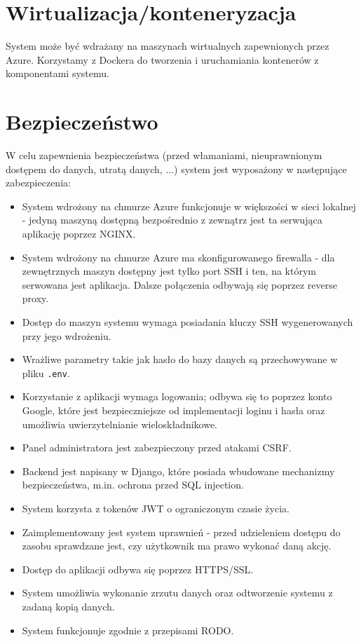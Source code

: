 \documentclass[11pt,a4paper]{article}
\renewcommand{\_}{\char`_}
\begin{document}
\section{Wirtualizacja/konteneryzacja}

System może być wdrażany na maszynach wirtualnych zapewnionych przez Azure. Korzystamy z Dockera do tworzenia i uruchamiania kontenerów z komponentami systemu.

\section{Bezpieczeństwo}

W celu zapewnienia bezpieczeństwa (przed włamaniami, nieuprawnionym dostępem do danych, utratą danych, ...) system jest wyposażony w następujące zabezpieczenia:
\begin{itemize}
    \item System wdrożony na chmurze Azure funkcjonuje w większości w sieci lokalnej - jedyną maszyną dostępną bezpośrednio z zewnątrz jest ta serwująca aplikację poprzez NGINX.
    \item System wdrożony na chmurze Azure ma skonfigurowanego firewalla - dla zewnętrznych maszyn dostępny jest tylko port SSH i ten, na którym serwowana jest aplikacja. Dalsze połączenia odbywają się poprzez reverse proxy.
    \item Dostęp do maszyn systemu wymaga posiadania kluczy SSH wygenerowanych przy jego wdrożeniu.
    \item Wrażliwe parametry takie jak hasło do bazy danych są przechowywane w pliku \texttt{.env}.
    \item Korzystanie z aplikacji wymaga logowania; odbywa się to poprzez konto Google, które jest bezpieczniejsze od implementacji loginu i hasła oraz umożliwia uwierzytelnianie wieloskładnikowe.
    \item Panel administratora jest zabezpieczony przed atakami CSRF.
    \item Backend jest napisany w Django, które posiada wbudowane mechanizmy bezpieczeństwa, m.in. ochrona przed SQL injection.
    \item System korzysta z tokenów JWT o ograniczonym czasie życia.
    \item Zaimplementowany jest system uprawnień - przed udzieleniem dostępu do zasobu sprawdzane jest, czy użytkownik ma prawo wykonać daną akcję.
    \item Dostęp do aplikacji odbywa się poprzez HTTPS/SSL.
    \item System umożliwia wykonanie zrzutu danych oraz odtworzenie systemu z zadaną kopią danych.
    \item System funkcjonuje zgodnie z przepisami RODO.
\end{itemize}
\end{document}

